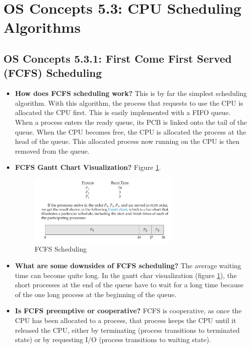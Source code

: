 \documentclass[12pt]{article}
\begin{document}
\section*{OS Concepts 5.3: CPU Scheduling Algorithms}

\subsection*{OS Concepts 5.3.1: First Come First Served (FCFS) Scheduling}

\begin{itemize}
    \item \textbf{How does FCFS scheduling work?} This is by far the simplest scheduling algorithm. With this algorithm, the process that requests to use the CPU is allocated the CPU first. This is easily implemented with a FIFO queue. When a process enters the ready queue, its PCB is linked onto the tail of the queue. When the CPU becomes free, the CPU is allocated the process at the head of the queue. This allocated process now running on the CPU is then removed from the queue.
    \item \textbf{FCFS Gantt Chart Visualization?} Figure \ref{fig:fcfs-scheduling}.
        \begin{figure}[ht]
            \centering
            \includegraphics[width=0.7\textwidth]{figures/fcfs-scheduling.jpg}
            \caption{FCFS Scheduling}
            \label{fig:fcfs-scheduling}
        \end{figure}
    \item \textbf{What are some downsides of FCFS scheduling?} The average waiting time can become quite long. In the gantt char visualization (figure \ref{fig:fcfs-scheduling}), the short processes at the end of the queue have to wait for a long time because of the one long process at the beginning of the queue.
    \item \textbf{Is FCFS preemptive or cooperative?} FCFS is cooperative, as once the CPU has been allocated to a process, that process keeps the CPU until it released the CPU, either by terminating (process transitions to terminated state) or by requesting I/O (process transitions to waiting state).
\end{itemize}
\end{document}
